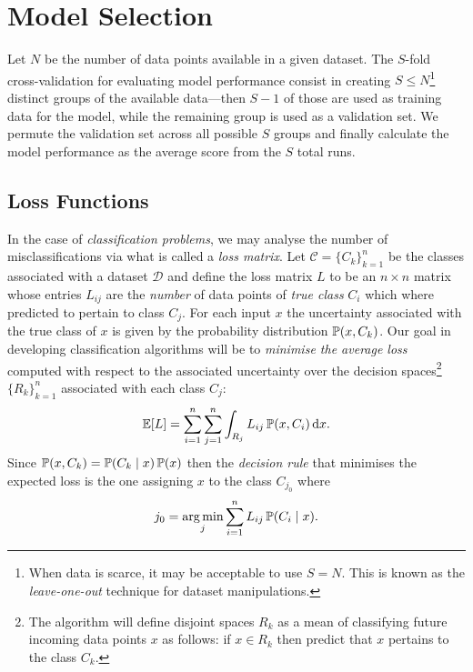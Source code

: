 \section{Model Selection}

\begin{definition}
\label{def:s-fold-cross-validation}
Let \(N\) be the number of data points available in a given dataset. The
\(S\)-fold cross-validation for evaluating model performance consist in creating
\(S \leq N\)\footnote{When data is scarce, it may be acceptable to use
  \(S = N\). This is known as the \emph{leave-one-out} technique for dataset
  manipulations.} distinct groups of the available data---then \(S-1\) of those
are used as training data for the model, while the remaining group is used as a
validation set. We permute the validation set across all possible \(S\) groups
and finally calculate the model performance as the average score from the \(S\)
total runs.
\end{definition}

\subsection{Loss Functions}

In the case of \emph{classification problems}, we may analyse the number of
misclassifications via what is called a \emph{loss matrix}. Let
\(\mathcal{C} = \{C_k\}_{k=1}^n\) be the classes associated with a dataset
\(\mathcal{D}\) and define the loss matrix \(L\) to be an \(n \times n\) matrix
whose entries \(L_{i j}\) are the \emph{number} of data points of \emph{true
  class} \(C_i\) which where predicted to pertain to class \(C_j\). For each
input \(x\) the uncertainty associated with the true class of \(x\) is given by
the probability distribution \(\operatorname{\mathbb{P}}(x, C_k)\). Our goal in developing
classification algorithms will be to \emph{minimise the average loss} computed
with respect to the associated uncertainty over the decision spaces\footnote{The
algorithm will define disjoint spaces \(R_k\) as a mean of classifying future
incoming data points \(x\) as follows: if \(x \in R_k\) then predict that \(x\)
pertains to the class \(C_k\).}
\(\{R_k\}_{k=1}^n\) associated with each class \(C_j\):
\[
\operatorname{\mathbb{E}}[L] = \sum_{i=1}^n \sum_{j=1}^n \int_{R_j} L_{i j} \operatorname{\mathbb{P}}(x, C_i)\, \mathrm{d} x.
\]
Since \(\operatorname{\mathbb{P}}(x, C_k) = \operatorname{\mathbb{P}}(C_k \mid x) \operatorname{\mathbb{P}}(x)\) then the \emph{decision
  rule} that minimises the expected loss is the one assigning \(x\) to the class
\(C_{j_0}\) where
\[
j_0 = \operatorname*{arg\,min}_j \sum_{i=1}^n L_{i j} \operatorname{\mathbb{P}}(C_i \mid x).
\]

